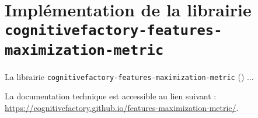 \section{Implémentation de la librairie \\ \texttt{cognitivefactory-features-maximization-metric}}
\label{annex:C.3-DESCRIPTION-IMPLEMENTATION-FEATURES-MAXIMIZATION-METRIC}
	
	La librairie \texttt{cognitivefactory-features-maximization-metric} (\cite{schild:2023:cognitivefactory-featuresmaximizationmetric}) ...
	
	\begin{leftBarInformation}
		La documentation technique est accessible au lien suivant : \url{https://cognitivefactory.github.io/features-maximization-metric/}.
	\end{leftBarInformation}